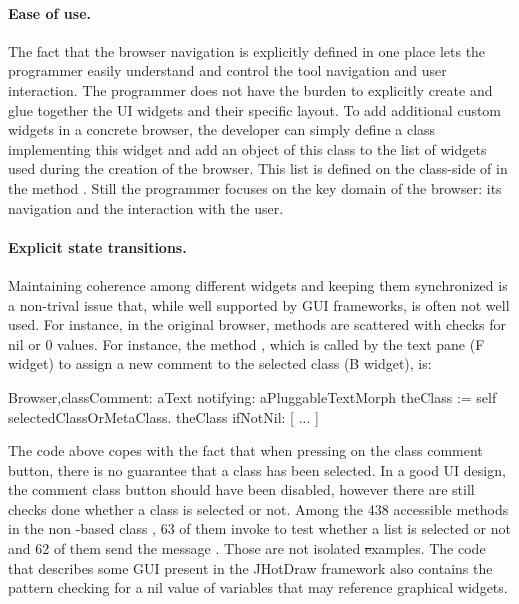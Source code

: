 \documentclass[a4paper,10pt,twoside]{book}
\begin{document}
\paragraph{Ease of use.}
The fact that the browser navigation is explicitly defined in one place lets the programmer easily understand and control the tool navigation and user interaction. The programmer does not have the burden to explicitly create and glue together the UI widgets and their specific layout. To add additional custom widgets in a concrete browser, the developer can simply define a class implementing this widget and add an object of this class to the list of widgets used during the creation of the browser. This list is defined on the class-side of  in the method . Still the programmer focuses on the key domain of the browser: its navigation and the interaction with the user. 

\paragraph{Explicit state transitions.} Maintaining coherence among different widgets and keeping them synchronized is a non-trival issue that, while well supported by GUI frameworks,  is often not well used. For instance, in the original \pharo browser, methods are scattered with checks for nil or 0 values. For instance, the method , which is called by the text pane (F widget) to assign a new comment to the selected class (B widget), is:

\begin{code}
Browser\sep{}classComment: aText notifying: aPluggableTextMorph 
    theClass := self selectedClassOrMetaClass.
    theClass
        ifNotNil: [ ... ]
\end{code}

The code above copes with the fact that when pressing on the class comment button, there is no guarantee that a class has been selected. In a good UI design, the comment class button should have been disabled, however there are still checks done whether a class is selected or not. Among the 438 accessible methods in the non \ob-based \pharo class , 63 of them invoke  to test whether a list is selected or not and 62 of them send the message . Those are not isolated \st examples. The code that describes some GUI present in the JHotDraw framework also contains the pattern checking for a nil value of variables that may reference graphical widgets. 
\end{document}
